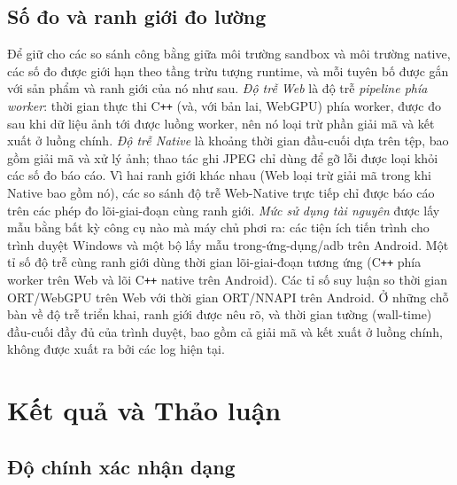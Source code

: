 \documentclass[conference]{IEEEtran}
\begin{document}
\subsection{Số đo và ranh giới đo lường}
Để giữ cho các so sánh công bằng giữa môi trường sandbox và môi trường native,
các số đo được giới hạn theo tầng trừu tượng runtime, và mỗi tuyên bố được gắn với
sản phẩm và ranh giới của nó như sau. \emph{Độ trễ Web} là độ trễ \emph{pipeline
phía worker}: thời gian thực thi C\texttt{++} (và, với bản lai, WebGPU) phía
worker, được đo sau khi dữ liệu ảnh tới được luồng worker, nên nó loại trừ phần
giải mã và kết xuất ở luồng chính. \emph{Độ trễ Native} là khoảng thời gian
đầu-cuối dựa trên tệp, bao gồm giải mã và xử lý ảnh; thao tác ghi JPEG chỉ dùng
để gỡ lỗi được loại khỏi các số đo báo cáo. Vì hai ranh giới khác nhau (Web loại
trừ giải mã trong khi Native bao gồm nó), các so sánh độ trễ Web-Native trực tiếp
chỉ được báo cáo trên các phép đo lõi-giai-đoạn cùng ranh giới. \emph{Mức sử dụng
tài nguyên} được lấy mẫu bằng bất kỳ công cụ nào mà máy chủ phơi ra: các tiện ích
tiến trình cho trình duyệt Windows và một bộ lấy mẫu trong-ứng-dụng/adb trên
Android. Một tỉ số độ trễ cùng ranh giới dùng thời gian lõi-giai-đoạn tương ứng
(C\texttt{++} phía worker trên Web và lõi C\texttt{++} native trên Android). Các
tỉ số suy luận so thời gian ORT/WebGPU trên Web với thời gian ORT/NNAPI trên
Android. Ở những chỗ bàn về độ trễ triển khai, ranh giới được nêu rõ, và thời gian
tường (wall-time) đầu-cuối đầy đủ của trình duyệt, bao gồm cả giải mã và kết xuất
ở luồng chính, không được xuất ra bởi các log hiện tại.

\section{Kết quả và Thảo luận}

\subsection{Độ chính xác nhận dạng}
\label{sec:results-recognition}
\end{document}
